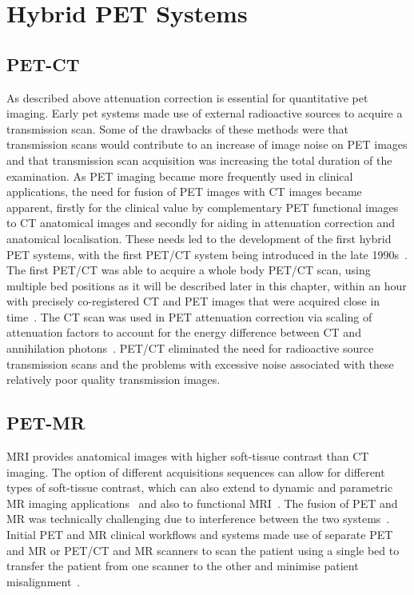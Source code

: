 \section{Hybrid PET Systems}
\subsection{PET-CT}
As described above attenuation correction is essential for quantitative \gls{pet} imaging. Early \gls{pet} systems made use of external radioactive sources to acquire a transmission scan. Some of the drawbacks of these methods were that transmission scans would contribute to an increase of image noise on PET images and that transmission scan acquisition was increasing the total duration of the examination.
As PET imaging became more frequently used in clinical applications, the need for fusion of PET images with CT images became apparent, firstly for the clinical value by complementary PET functional images to CT anatomical images and secondly for aiding in attenuation correction and anatomical localisation. These needs led to the development of the first hybrid PET systems, with the first PET/CT system being introduced in the late 1990s~\cite{Townsend2008}.
The first PET/CT was able to acquire a whole body PET/CT scan, using multiple bed positions as it will be described later in this chapter, within an hour with precisely co-registered CT and PET images that were acquired close in time~\cite{Beyer2000}. The CT scan was used in PET attenuation correction via scaling of attenuation factors to account for the energy difference between CT and annihilation photons~\cite{Kinahan1998}. PET/CT eliminated the need for radioactive source transmission scans and the problems with excessive noise associated with these relatively poor quality transmission images.

\subsection{PET-MR}
\label{sec:PET_MR_Systems}
MRI provides anatomical images with higher soft-tissue contrast than CT imaging. The option of different acquisitions sequences can allow for different types of soft-tissue contrast, which can also extend to dynamic and parametric MR imaging applications~\cite{Besson2020} and also to functional MRI~\cite{Kolb2012}.
The fusion of PET and MR was technically challenging due to interference between the two systems~\cite{Disselhorst2014}.
Initial PET and MR clinical workflows and systems made use of separate PET and MR or PET/CT and MR scanners to scan the patient using a single bed to transfer the patient from one scanner to the other and minimise patient misalignment~\cite{Zaidi2011,Veit-Haibach2013}.

